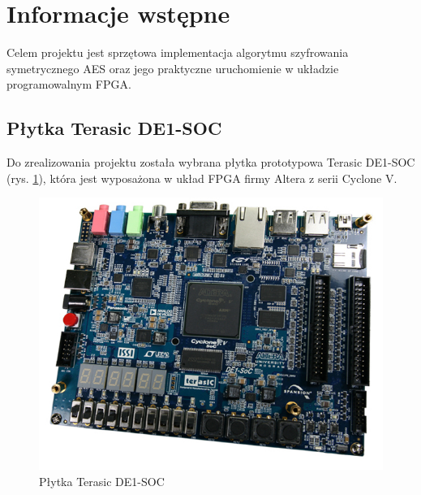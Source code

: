 \section{Informacje wstępne}
\label{sec:infornacje-wstepne}

Celem projektu jest sprzętowa implementacja algorytmu szyfrowania symetrycznego AES oraz jego praktyczne uruchomienie w układzie programowalnym FPGA.

\subsection{Płytka Terasic DE1-SOC}
Do zrealizowania projektu została wybrana płytka prototypowa Terasic DE1-SOC (rys. \ref{fig:fpga-board}), która jest wyposażona w układ FPGA firmy Altera z serii Cyclone V.

\begin{figure}[!h]
\centering
\includegraphics[width=\textwidth]{pictures/fpga-board.jpg}
\caption{Płytka Terasic DE1-SOC \cite{plytka}}
\label{fig:fpga-board}
\end{figure}


